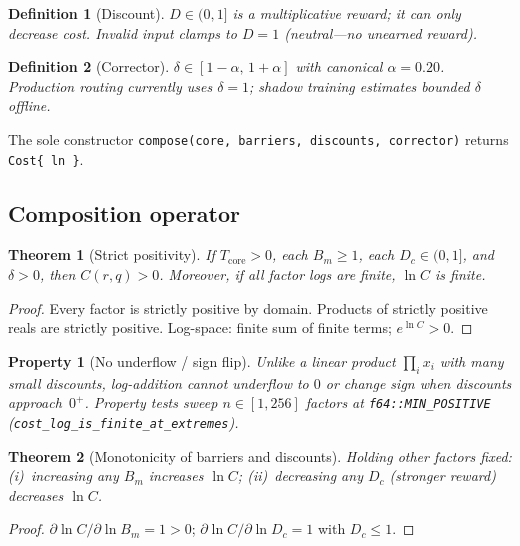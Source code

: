 \documentclass[11pt,a4paper]{article}
\newtheorem{theorem}{Theorem}
\newtheorem{definition}{Definition}
\newtheorem{property}{Property}
\begin{document}
\begin{definition}[Discount]
$D \in (0, 1]$ is a multiplicative \emph{reward}; it can only decrease cost.
Invalid input clamps to $D = 1$ (neutral---no unearned reward).
\end{definition}

\begin{definition}[Corrector]
$\delta \in [1-\alpha,\, 1+\alpha]$ with canonical $\alpha = 0.20$.
Production routing currently uses $\delta = 1$; shadow training estimates
bounded $\delta$ offline.
\end{definition}

The sole constructor \texttt{compose(core, barriers, discounts, corrector)}
returns \texttt{Cost\{ ln \}}.

\subsection{Composition operator}

\begin{theorem}[Strict positivity]\label{thm:pos}
If $T_{\mathrm{core}} > 0$, each $B_m \ge 1$, each $D_c \in (0,1]$, and
$\delta > 0$, then $C(r,q) > 0$.
Moreover, if all factor logs are finite, $\ln C$ is finite.
\end{theorem}

\begin{proof}
Every factor is strictly positive by domain.
Products of strictly positive reals are strictly positive.
Log-space: finite sum of finite terms; $e^{\ln C} > 0$.
\end{proof}

\begin{property}[No underflow / sign flip]
Unlike a linear product $\prod_i x_i$ with many small discounts,
log-addition cannot underflow to $0$ or change sign when discounts
approach~$0^+$.
Property tests sweep $n \in [1,256]$ factors at \texttt{f64::MIN\_POSITIVE}
(\texttt{cost\_log\_is\_finite\_at\_extremes}).
\end{property}

\begin{theorem}[Monotonicity of barriers and discounts]
Holding other factors fixed:
(i)~increasing any $B_m$ increases $\ln C$;
(ii)~decreasing any $D_c$ (stronger reward) decreases $\ln C$.
\end{theorem}

\begin{proof}
$\partial \ln C / \partial \ln B_m = 1 > 0$;
$\partial \ln C / \partial \ln D_c = 1$ with $D_c \le 1$.
\end{proof}
\end{document}
